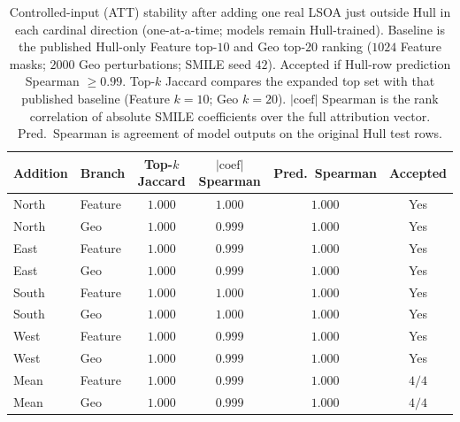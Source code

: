 \begin{table}[htbp]
\centering
\caption{Controlled-input (ATT) stability after adding one real LSOA just outside Hull
in each cardinal direction (one-at-a-time; models remain Hull-trained).
Baseline is the published Hull-only Feature top-$10$ and Geo top-$20$ ranking
($1024$ Feature masks; $2000$ Geo perturbations; SMILE seed $42$).
Accepted if Hull-row prediction Spearman $\ge 0.99$.
Top-$k$ Jaccard compares the expanded top set with that published baseline
(Feature $k{=}10$; Geo $k{=}20$).
$|\mathrm{coef}|$ Spearman is the rank correlation of absolute SMILE coefficients
over the full attribution vector.
Pred.\ Spearman is agreement of model outputs on the original Hull test rows.}
\label{tab:hull_att_stability}
\begin{tabular}{llcccc}
\toprule
Addition & Branch & Top-$k$ Jaccard & $|\mathrm{coef}|$ Spearman & Pred.\ Spearman & Accepted \\
\midrule
North & Feature & $1.000$ & $1.000$ & $1.000$ & Yes \\
North & Geo     & $1.000$ & $0.999$ & $1.000$ & Yes \\
East  & Feature & $1.000$ & $0.999$ & $1.000$ & Yes \\
East  & Geo     & $1.000$ & $0.999$ & $1.000$ & Yes \\
South & Feature & $1.000$ & $1.000$ & $1.000$ & Yes \\
South & Geo     & $1.000$ & $1.000$ & $1.000$ & Yes \\
West  & Feature & $1.000$ & $0.999$ & $1.000$ & Yes \\
West  & Geo     & $1.000$ & $0.999$ & $1.000$ & Yes \\
\midrule
Mean  & Feature & $1.000$ & $0.999$ & $1.000$ & $4/4$ \\
Mean  & Geo     & $1.000$ & $0.999$ & $1.000$ & $4/4$ \\
\bottomrule
\end{tabular}
\end{table}

